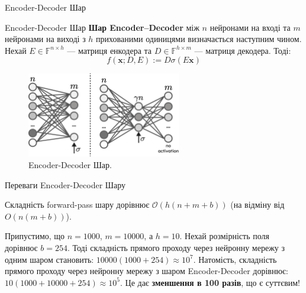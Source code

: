 \documentclass{zkdl-presentation-template}
\begin{document}
    \begin{frame}{Encoder-Decoder Шар}
        \begin{block}{Encoder-Decoder Шар}
            \textbf{Шар Encoder–Decoder} між $n$ нейронами на вході та $m$
нейронами на виході з $h$ прихованими одиницями визначається наступним чином.
Нехай $E \in \mathbb{F}^{n \times h}$ — матриця енкодера та $D \in \mathbb{F}^{h
\times m}$ — матриця декодера. Тоді:
\begin{equation*}
    f(\boldsymbol{x}; D, E) := D \sigma(E\boldsymbol{x})
\end{equation*}
        \end{block}

        \begin{figure}
            \centering
            \includegraphics[width=0.6\textwidth]{images/ed.pdf}
            \caption{Encoder-Decoder Шар.}
            \label{figure:encoder-decoder}
        \end{figure}
    \end{frame}

    \begin{frame}{Переваги Encoder-Decoder Шару}
        \begin{lemma}
            Складність forward-pass шару дорівнює $\mathcal{O}(h(n + m +
            b))$ (на відміну від $O(n(m + b))$).
        \end{lemma}

        \begin{example}
            Припустимо, що $n = 1000$, $m = 10000$, а $h = 10$. Нехай
        розмірність поля дорівнює $b = 254$. Тоді складність прямого проходу через
        нейронну мережу з одним шаром становить: $10000(1000+254)\approx 10^7$. Натомість,
        складність прямого проходу через нейронну мережу з шаром Encoder-Decoder
        дорівнює: $10(1000+10000+254)\approx 10^5$. Це дає \textbf{зменшення в 100 разів}, що є
        суттєвим!
        \end{example}
    \end{frame}
\end{document}
